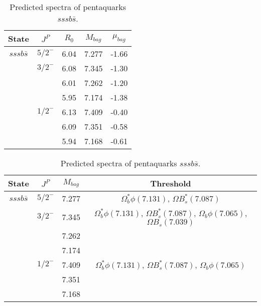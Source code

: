 \documentclass[prd,twocolumn,floatfix,nofootinbib]{revtex4}
\begin{document}
\renewcommand{\tabcolsep}{0.5cm}
\renewcommand{\arraystretch}{1.2}
\begin{table*}[!htbp]
    \caption{Predicted spectra of pentaquarks $sssb\bar{s}$.}
    \begin{tabular}{ccccc}
        \hline\hline
        {\rm State} &$J^{P}$ &$R_{0}$ &$M_{bag}$ &$\mu_{bag}$ \\ \hline
        $sssb\bar{s}$
            &${5/2}^{-}$    &6.04   &7.277  &-1.66 \\
            &${3/2}^{-}$    &6.08   &7.345  &-1.30 \\
            &               &6.01   &7.262  &-1.20 \\
            &               &5.95   &7.174  &-1.38 \\
            &${1/2}^{-}$    &6.13   &7.409  &-0.40 \\
            &               &6.09   &7.351  &-0.58 \\
            &               &5.94   &7.168  &-0.61 \\
        
        \hline\hline
    \end{tabular}
\end{table*}

\renewcommand{\tabcolsep}{0.5cm}
\renewcommand{\arraystretch}{1.2}
\begin{table*}[!htbp]
    \caption{Predicted spectra of pentaquarks $sssb\bar{s}$.}
    \begin{tabular}{cccc}
        \hline\hline
        {\rm State} &$J^{P}$ &$M_{bag}$ &Threshold \\ \hline
        $sssb\bar{s}$
            &${5/2}^{-}$    &7.277  &$\Omega_{b}^{\ast}\phi(7.131)$, $\Omega B_{s}^{\ast}(7.087)$ \\
            &${3/2}^{-}$    &7.345  &$\Omega_{b}^{\ast}\phi(7.131)$, $\Omega B_{s}^{\ast}(7.087)$, $\Omega_{b}\phi(7.065)$, $\Omega B_{s}(7.039)$ \\
            &               &7.262  & \\
            &               &7.174  & \\
            &${1/2}^{-}$    &7.409  &$\Omega_{b}^{\ast}\phi(7.131)$, $\Omega B_{s}^{\ast}(7.087)$, $\Omega_{b}\phi(7.065)$ \\
            &               &7.351  & \\
            &               &7.168  & \\
        
        \hline\hline
    \end{tabular}
\end{table*}
\end{document}
